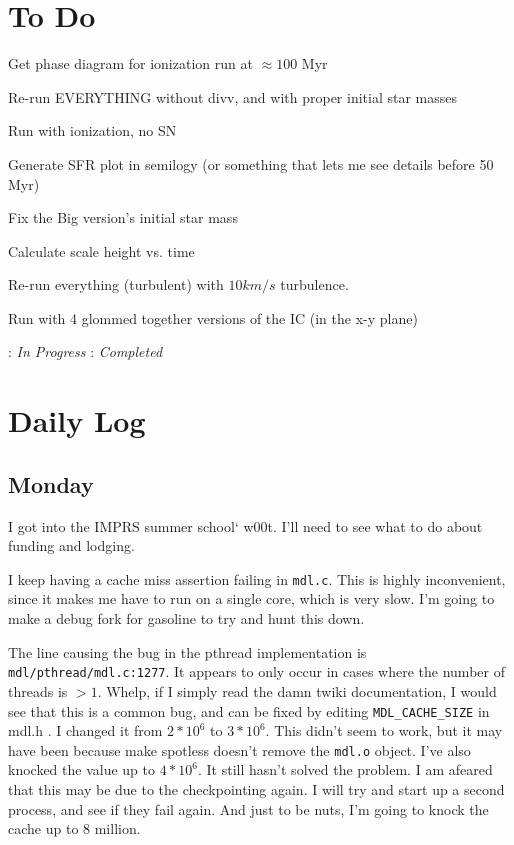 \documentclass[11pt,letterpaper]{article}
\begin{document}
\section{To Do}
\begin{bullets}
\item[\checkmark] Get phase diagram for ionization run at $\approx 100$ Myr
\item[\checkmark] Re-run EVERYTHING without divv, and with proper initial star masses
\item[\checkmark] Run with ionization, no SN
\item[\checkmark] Generate SFR plot in semilogy (or something that lets me see details before 50 Myr)
\item[\textleaf] Fix the Big version's initial star mass
\item[\checkmark] Calculate scale height vs. time
\item[\textleaf] Re-run everything (turbulent) with $10km/s$ turbulence.
\item[\textleaf] Run with 4 glommed together versions of the IC (in the x-y plane)
\end{bullets}

\textleaf : \textit{In Progress} \qquad \checkmark : \textit{Completed}
\section{Daily Log}

\subsection{Monday}

I got into the IMPRS summer school` w00t. I'll need to see what to do
about funding and lodging.

I keep having a cache miss assertion failing in \texttt{mdl.c}. This is
highly inconvenient, since it makes me have to run on a single core,
which is very slow. I'm going to make a debug fork for gasoline to try
and hunt this down.

The line causing the bug in the pthread implementation is
\texttt{mdl/pthread/mdl.c:1277}. It appears to only occur in cases where
the number of threads is $>1$. Whelp, if I simply read the damn twiki
documentation, I would see that this is a common bug, and can be fixed
by editing \texttt{MDL\_CACHE\_SIZE} in mdl.h . I changed it from
$2*10^6$ to $3*10^6$. This didn't seem to work, but it may have been
because make spotless doesn't remove the \texttt{mdl.o} object. I've
also knocked the value up to $4*10^6$. It still hasn't solved the
problem. I am afeared that this may be due to the checkpointing again. I
will try and start up a second process, and see if they fail again. And
just to be nuts, I'm going to knock the cache up to 8 million.
\end{document}
